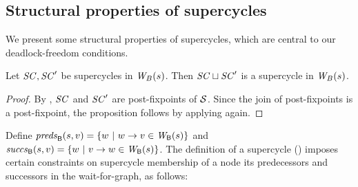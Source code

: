 \subsection{Structural properties of supercycles}
\label{secn:supercycle-structural}


We present some structural properties of supercycles, which
are central to our deadlock-freedom conditions.


\begin{proposition} \label{prop:supercycle:union}
Let $\mathit{SC}, \mathit{SC}'$ be supercycles in $\mathit{W}_{B}({s})$. Then $\mathit{SC} \sqcup \mathit{SC}'$ is
a supercycle in $\mathit{W}_{B}({s})$.
\end{proposition}
%
\begin{proof}
By , $\mathit{SC}$ and $\mathit{SC}'$ are post-fixpoints of $\mathcal{S}$. Since the join of post-fixpoints is a post-fixpoint, 
the proposition follows by applying  again.
\end{proof}





Define
$\mathit{preds}_{\mathsf{B}}({s, v}) = \{ w ~|~ w \rightarrow v \in \mathit{W}_{\mathsf{B}}({s}) \}$ and 
$\mathit{succs}_{\mathsf{B}}({s, v}) = \{ w ~|~ v \rightarrow w \in \mathit{W}_{\mathsf{B}}({s}) \}$.
The definition of a supercycle () 
imposes certain constraints on supercycle membership of a node \wrt its predecessors and successors
in the wait-for-graph, as follows:

